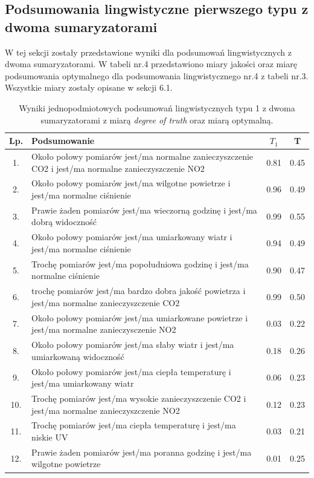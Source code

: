 \documentclass{article}
\begin{document}
\subsection{Podsumowania lingwistyczne pierwszego typu z dwoma sumaryzatorami}
W tej sekcji zostały przedstawione wyniki dla podsumowań lingwistycznych z dwoma sumaryzatorami. 
W tabeli nr.4 przedstawiono miary jakości oraz miarę podsumowania optymalnego dla podsumowania lingwistycznego nr.4 z tabeli nr.3. Wszystkie miary zostały opisane w sekcji 6.1.


\begin{table}[H]
\begin{center}
\normalsize %
\begin{tabular}{|c|p{8cm}|c|c|} %
\hline
\textbf{Lp.} & \textbf{Podsumowanie} & \textbf{\(T_1\)} & \textbf{T} \\ \hline
1. & Około połowy pomiarów  jest/ma normalne zanieczyszczenie CO2 i jest/ma normalne zanieczyszczenie NO2 & 0.81 & 0.45 \\ \hline
2. & Około połowy pomiarów  jest/ma wilgotne powietrze i jest/ma normalne ciśnienie  & 0.96 & 0.49 \\ \hline 
3. & Prawie żaden pomiarów jest/ma wieczorną godzinę i jest/ma dobrą widoczność & 0.99 & 0.55 \\ \hline
4. & Około połowy pomiarów  jest/ma umiarkowany wiatr i jest/ma normalne ciśnienie  & 0.94 & 0.49 \\ \hline
5. & Trochę pomiarów jest/ma popołudniowa godzinę i jest/ma normalne ciśnienie  & 0.90 & 0.47 \\ \hline
6. & trochę pomiarów  jest/ma bardzo dobra jakość powietrza i jest/ma normalne zanieczyszczenie CO2 & 0.99 & 0.50 \\ \hline 
7. & Około połowy pomiarów  jest/ma umiarkowane powietrze i jest/ma normalne zanieczysczenie NO2 & 0.03 & 0.22 \\ \hline
8. & Około połowy pomiarów  jest/ma słaby wiatr i jest/ma umiarkowaną widoczność & 0.18 & 0.26 \\ \hline
9. & Około połowy pomiarów  jest/ma ciepła temperaturę i jest/ma umiarkowany wiatr & 0.06 & 0.23 \\ \hline 
10. & Trochę pomiarów jest/ma wysokie zanieczyszczenie CO2 i jest/ma normalne zanieczyszczenie NO2 & 0.12 & 0.23 \\ \hline
11. & Trochę pomiarów jest/ma ciepła temperaturę i jest/ma niskie UV & 0.03 & 0.21 \\ \hline
12. & Prawie żaden pomiarów jest/ma poranna godzinę i jest/ma wilgotne powietrze & 0.01 & 0.25 \\ \hline
\end{tabular}
\caption{Wyniki jednopodmiotowych podsumowań lingwistycznych typu 1 z dwoma sumaryzatorami z miarą \textit{degree of truth} oraz miarą optymalną.}
\end{center}
\end{table}
\end{document}
